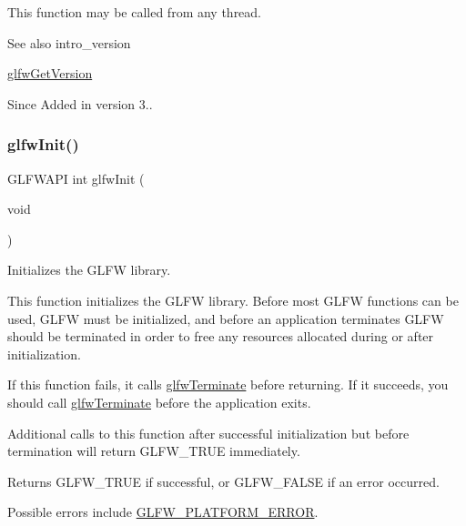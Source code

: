 This function may be called from any thread.

\begin{DoxySeeAlso}{See also}
intro\+\_\+version 

\hyperlink{group__init_ga2402c7824ac0194c13722790ff9559ff}{glfw\+Get\+Version}
\end{DoxySeeAlso}
\begin{DoxySince}{Since}
Added in version 3.. 
\end{DoxySince}
\mbox{\label{group__init_gab41771f0215a2e0afb4cf1cf98082d40}} 
\subsubsection{\texorpdfstring{glfw\+Init()}{glfwInit()}}
{\footnotesize\ttfamily G\+L\+F\+W\+A\+PI int glfw\+Init (\begin{DoxyParamCaption}\item[{void}]{ }\end{DoxyParamCaption})}



Initializes the G\+L\+FW library. 

This function initializes the G\+L\+FW library. Before most G\+L\+FW functions can be used, G\+L\+FW must be initialized, and before an application terminates G\+L\+FW should be terminated in order to free any resources allocated during or after initialization.

If this function fails, it calls \hyperlink{group__init_gafd90e6fd4819ea9e22e5e739519a6504}{glfw\+Terminate} before returning. If it succeeds, you should call \hyperlink{group__init_gafd90e6fd4819ea9e22e5e739519a6504}{glfw\+Terminate} before the application exits.

Additional calls to this function after successful initialization but before termination will return {\ttfamily G\+L\+F\+W\+\_\+\+T\+R\+UE} immediately.

\begin{DoxyReturn}{Returns}
{\ttfamily G\+L\+F\+W\+\_\+\+T\+R\+UE} if successful, or {\ttfamily G\+L\+F\+W\+\_\+\+F\+A\+L\+SE} if an error occurred.
\end{DoxyReturn}
Possible errors include \hyperlink{group__errors_gad44162d78100ea5e87cdd38426b8c7a1}{G\+L\+F\+W\+\_\+\+P\+L\+A\+T\+F\+O\+R\+M\+\_\+\+E\+R\+R\+OR}.

